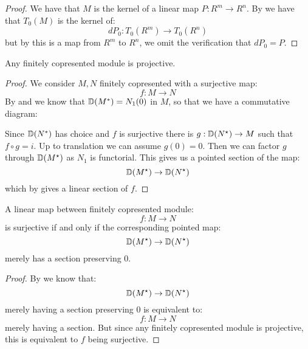 \begin{proof}
We have that $M$ is the kernel of a linear map $P:R^m\to R^n$. By  we have that $T_0(M)$ is the kernel of:
\[dP_0:T_0(R^m)\to T_0(R^n)\]
but by  this is a map from $R^m$ to $R^n$, we omit the verification that $dP_0 = P$.
\end{proof}

\begin{lemma}
Any finitely copresented module is projective.
\end{lemma}

\begin{proof}
We consider $M,N$ finitely copresented with a surjective map:
\[f:M\to N\]
By  and  we know that $\mathbb{D}(M^*) = N_1(0)$ in $M$, so that we have a commutative diagram:
\begin{center}
\end{center}
Since $\mathbb{D}(N^*)$ has choice and $f$ is surjective there is $g:\mathbb{D}(N^\star)\to M$ such that $f\circ g = i$. Up to translation we can assume $g(0) = 0$.
Then we can factor $g$ through $\mathbb{D}(M^\star)$ as $N_1$ is functorial. This gives us a pointed section of the map:
\[\mathbb{D}(M^\star) \to \mathbb{D}(N^\star)\]
which by  gives a linear section of $f$. 
\end{proof}

\begin{lemma}\label{neighborhood-tangent-correspondence-smooth}
A linear map between finitely copresented module:
\[f:M\to N\]
is surjective if and only if the corresponding pointed map:
\[\mathbb{D}(M^\star) \to \mathbb{D}(N^\star)\]
merely has a section preserving $0$.
\end{lemma}

\begin{proof}
By  we know that:
\[\mathbb{D}(M^\star) \to \mathbb{D}(N^\star)\]
merely having a section preserving $0$ is equivalent to:
\[f:M\to N\]
merely having a section. But since any finitely copresented module is projective, this is equivalent to $f$ being surjective.
\end{proof}


